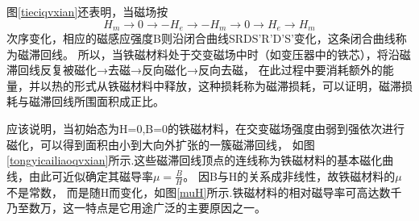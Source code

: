 \documentclass{ctexart}
\begin{document}
  图\ref{tieciqvxian}还表明，当磁场按$$H_{m}\rightarrow 0\rightarrow -H_{e}\rightarrow -H_{m}\rightarrow 0\rightarrow H_{e}\rightarrow H_{m}$$
  次序变化，相应的磁感应强度B则沿闭合曲线SRDS'R'D'S'变化，这条闭合曲线称为磁滞回线。
  所以，当铁磁材料处于交变磁场中时（如变压器中的铁芯），将沿磁滞回线反复被磁化→去磁→反向磁化→反向去磁，
  在此过程中要消耗额外的能量，并以热的形式从铁磁材料中释放，这种损耗称为磁滞损耗，可以证明，磁滞损耗与磁滞回线所围面积成正比。

  应该说明，当初始态为H=0,B=0的铁磁材料，在交变磁场强度由弱到强依次进行磁化，可以得到面积由小到大向外扩张的一簇磁滞回线，
  如图\ref{tongyicailiaoqvxian}所示.这些磁滞回线顶点的连线称为铁磁材料的基本磁化曲线，由此可近似确定其磁导率$\mu =\frac{B}{H}$。
  因B与H的关系成非线性，故铁磁材料的$\mu$不是常数，
  而是随H而变化，如图\ref{muH}所示.铁磁材料的相对磁导率可高达数千乃至数万，这一特点是它用途广泛的主要原因之一。
\end{document}

